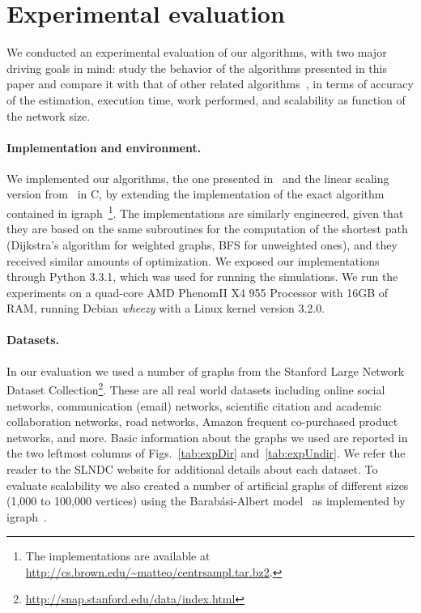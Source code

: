 \section{Experimental evaluation}\label{sec:centrsamplexper}
We conducted an experimental evaluation of our algorithms, with two major
driving goals in mind: study the behavior of the algorithms presented in this
paper and compare it with that of other related
algorithms~\citep{Brandes01,BrandesP07,JacobKLPT05,GeisbergerSS08}, in terms of
accuracy of the estimation, execution time, work performed, and scalability as
function of the network size.

\paragraph{Implementation and environment.}
We implemented our algorithms, the one presented in~\citep{BrandesP07,JacobKLPT05}
and the linear scaling version from~\citep{GeisbergerSS08} in C, by extending
the implementation of the exact algorithm~\citep{Brandes01} contained in
igraph~\citep{igraph}\footnote{The implementations are available at
\url{http://cs.brown.edu/~matteo/centrsampl.tar.bz2}.}. The implementations are similarly engineered, given that
they are based on the same subroutines for the computation of the shortest path
(Dijkstra's algorithm for weighted graphs, BFS for unweighted ones), and they
received similar amounts of optimization. We exposed our implementations through
Python 3.3.1, which was used for running the simulations. We run the experiments
on a quad-core AMD Phenom\texttrademark II X4 955 Processor with 16GB of RAM,
running Debian \emph{wheezy} with a Linux kernel version 3.2.0.

\paragraph{Datasets.} In our evaluation we used a number of graphs from the
Stanford Large Network Dataset
Collection\footnote{\url{http://snap.stanford.edu/data/index.html}}. These are
all real world datasets including online social networks, communication (email)
networks, scientific citation and academic collaboration networks, road
networks, Amazon frequent co-purchased product networks, and more. Basic
information about the graphs we used are reported in the two leftmost columns 
of Figs.~\ref{tab:expDir} and~\ref{tab:expUndir}. We refer the
reader to the SLNDC website for additional details about each dataset. 
To evaluate scalability we also created a number of artificial graphs of
different sizes (1,000 to 100,000 vertices) using the Barab\'asi-Albert
model~\citep{BarabasiA99} as implemented by igraph~\citep{igraph}. 

